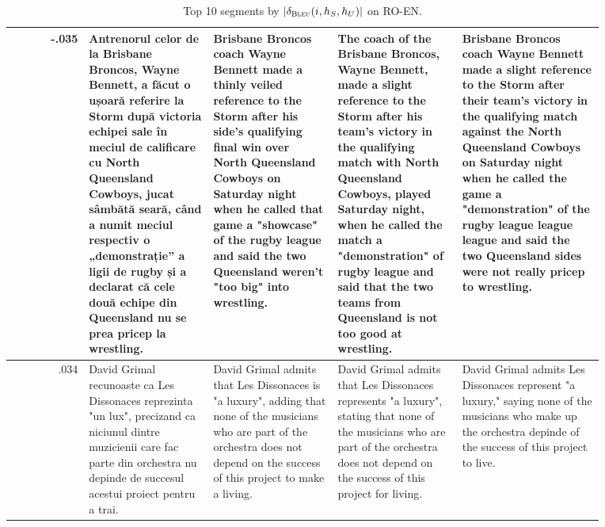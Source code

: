 \begin{table}[ht]
\begin{tabular}{r @{\hspace{1mm}} p{0.21\linewidth}p{0.21\linewidth}p{0.21\linewidth}p{0.24\linewidth}}
-.035 & Antrenorul celor de la Brisbane Broncos, Wayne Bennett, a făcut o ușoară referire la Storm după victoria echipei sale în meciul de calificare cu North Queensland Cowboys, jucat sâmbătă seară, când a numit meciul respectiv o „demonstrație” a ligii de rugby și a declarat că cele două echipe din Queensland nu se prea pricep la wrestling. & Brisbane Broncos coach Wayne Bennett made a thinly veiled reference to the Storm after his side's qualifying final win over North Queensland Cowboys on Saturday night when he called that game a "showcase" of the rugby league and said the two Queensland weren't "too big" into wrestling. & The coach of the Brisbane Broncos, Wayne Bennett, made a slight reference to the Storm after his team's victory in the qualifying match with North Queensland Cowboys, played Saturday night, when he called the match a "demonstration" of rugby league and said that the two teams from Queensland is not too good at wrestling. & Brisbane Broncos coach Wayne Bennett made a slight reference to the Storm after their team's victory in the qualifying match against the North Queensland Cowboys on Saturday night when he called the game a "demonstration" of the rugby league league league and said the two Queensland sides were not really pricep to wrestling. \\\hline
.034 & David Grimal recunoaste ca Les Dissonaces reprezinta "un lux", precizand ca niciunul dintre muzicienii care fac parte din orchestra nu depinde de succesul acestui proiect pentru a trai. & David Grimal admits that Les Dissonaces is "a luxury", adding that none of the musicians who are part of the orchestra does not depend on the success of this project to make a living. & David Grimal admits that Les Dissonaces represents "a luxury", stating that none of the musicians who are part of the orchestra does not depend on the success of this project for living. & David Grimal admits Les Dissonaces represent "a luxury," saying none of the musicians who make up the orchestra depinde of the success of this project to live. \\\hline
\end{tabular}
\caption{Top 10 segments by $|\delta_{{\textsc{Bleu}}}(i, h_S, h_U)|$ on RO-EN.}
\label{tab:bleu-top-10-roen}
\end{table}
